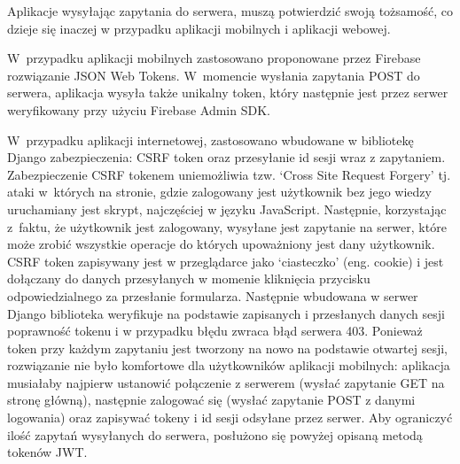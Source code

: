 Aplikacje wysyłając zapytania do serwera, muszą potwierdzić swoją tożsamość, co dzieje się inaczej w przypadku aplikacji mobilnych i aplikacji webowej.

W~przypadku aplikacji mobilnych zastosowano proponowane przez Firebase rozwiązanie JSON Web Tokens. W~momencie wysłania zapytania POST do serwera, aplikacja wysyła także unikalny token, który następnie jest przez serwer weryfikowany przy użyciu Firebase Admin SDK.

W~przypadku aplikacji internetowej, zastosowano wbudowane w bibliotekę Django zabezpieczenia: CSRF token oraz przesyłanie id sesji wraz z zapytaniem. Zabezpieczenie CSRF tokenem uniemożliwia tzw. `Cross Site Request Forgery' tj. ataki w~których na stronie, gdzie zalogowany jest użytkownik bez jego wiedzy uruchamiany jest skrypt, najczęściej w języku JavaScript. Następnie, korzystając z~faktu, że użytkownik jest zalogowany, wysyłane jest zapytanie na serwer, które może zrobić wszystkie operacje do których upoważniony jest dany użytkownik. CSRF token zapisywany jest w przeglądarce jako `ciasteczko' (eng. cookie) i jest dołączany do danych przesyłanych w momenie kliknięcia przycisku odpowiedzialnego za przesłanie formularza. Następnie wbudowana w serwer Django biblioteka weryfikuje na podstawie zapisanych i przesłanych danych sesji poprawność tokenu i w przypadku błędu zwraca błąd serwera 403.
Ponieważ token przy każdym zapytaniu jest tworzony na nowo na podstawie otwartej sesji, rozwiązanie nie było komfortowe dla użytkowników aplikacji mobilnych: aplikacja musiałaby najpierw ustanowić połączenie z serwerem (wysłać zapytanie GET na stronę główną), następnie zalogować się (wysłać zapytanie POST z danymi logowania) oraz zapisywać tokeny i id sesji odsyłane przez serwer. Aby ograniczyć ilość zapytań wysyłanych do serwera, posłużono się powyżej opisaną metodą tokenów JWT.
